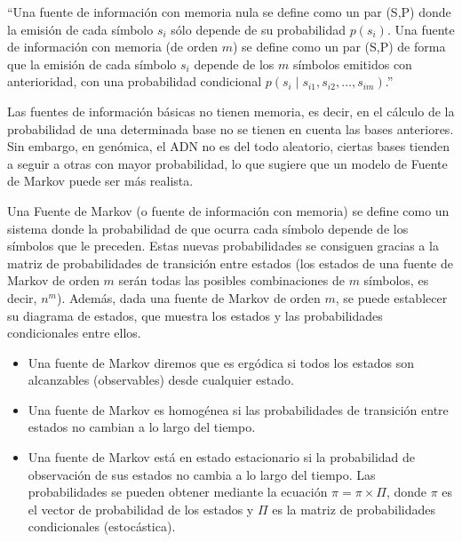 \documentclass[11pt,spanish,listoffigures,listoftables]{tfgetsinf}
\begin{document}
“Una fuente de información con memoria nula se define como un par (S,P) donde la emisión de cada símbolo \( s_i \) sólo depende de su probabilidad \( p(s_i) \). Una fuente de información con memoria (de orden \( m \)) se define como un par (S,P) de forma que la emisión de cada símbolo \( s_i \) depende de los \( m \) símbolos emitidos con anterioridad, con una probabilidad condicional \( p(s_i \mid s_{i1}, s_{i2}, \dots, s_{im}) \).”\cite{fuentesupv}

Las fuentes de información básicas no tienen memoria, es decir, en el cálculo de la probabilidad de una determinada base no se tienen en cuenta las bases anteriores. Sin embargo, en genómica, el ADN no es del todo aleatorio, ciertas bases tienden a seguir a otras con mayor probabilidad, lo que sugiere que un modelo de Fuente de Markov puede ser más realista. 

Una Fuente de Markov (o fuente de información con memoria) se define como un sistema donde la probabilidad de que ocurra cada símbolo depende de los símbolos que le preceden. Estas nuevas probabilidades se consiguen gracias a la matriz de probabilidades de transición entre estados (los estados de una fuente de Markov de orden \( m \) serán todas las posibles combinaciones de \( m \) símbolos, es decir, \( n^m \)). Además, dada una fuente de Markov de orden \( m \), se puede establecer su diagrama de estados, que muestra los estados y las probabilidades condicionales entre ellos\cite[p.~20]{ROB}.

\begin{itemize}
   \item Una fuente de Markov diremos que es ergódica si todos los estados son alcanzables (observables) desde cualquier estado.
   \item Una fuente de Markov es homogénea si las probabilidades de transición entre estados no cambian a lo largo del tiempo.
   \item Una fuente de Markov está en estado estacionario si la probabilidad de observación de sus estados no cambia a lo largo del tiempo. Las probabilidades se pueden obtener mediante la ecuación $\pi = \pi \times \Pi$, donde $\pi$ es el vector de probabilidad de los estados y $\Pi$ es la matriz de probabilidades condicionales (estocástica).
\end{itemize}
\end{document}
